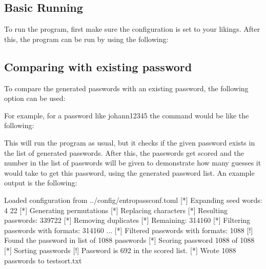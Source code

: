 \documentclass[letterpaper,10pt,english]{sphinxmanual}
\begin{document}
\subsection{Basic Running}
\label{\detokenize{usage:basic-running}}
\sphinxAtStartPar
To run the program, first make sure the configuration is set to your likings. After this, the program can be run by using the following:

\begin{sphinxVerbatim}[commandchars=\\\{\}]
\end{sphinxVerbatim}


\subsection{Comparing with existing password}
\label{\detokenize{usage:comparing-with-existing-password}}
\sphinxAtStartPar
To compare the generated passwords with an existing password, the following option can be used:

\begin{sphinxVerbatim}[commandchars=\\\{\}]
  
\end{sphinxVerbatim}

\sphinxAtStartPar
For example, for a password like johann12345 the command would be like the following:

\begin{sphinxVerbatim}[commandchars=\\\{\}]
  
\end{sphinxVerbatim}

\sphinxAtStartPar
This will run the program as usual, but it checks if the given password exists in the list of generated passwords. After this, the passwords get scored and the number in the list of passwords will be given to demonstrate how many guesses it would take to get this password, using the generated password list. An example output is the following:

\begin{sphinxVerbatim}[commandchars=\\\{\}]
[*] Loaded configuration from ../config/entropass\PYGZus{}conf.toml
[*] Expanding seed words:  4 \PYGZhy{}\PYGZgt{} 22
[*] Generating permutations
[*] Replacing characters
[*] Resulting passwords: 339722
[*] Removing duplicates
[*] Remaining: 314160
[*] Filtering passwords with formats: 314160 ...
[*] Filtered passwords with formats: 1088
[!] Found the password in list of 1088 passwords
[*] Scoring password 1088 of 1088
[*] Sorting passwords
[!] Password is \PYGZsh{}692 in the scored list.
[*] Wrote 1088 passwords to test\PYGZus{}sort.txt
\end{sphinxVerbatim}
\end{document}

